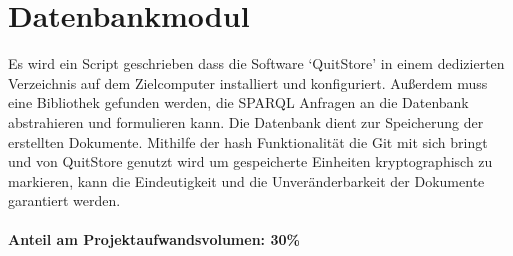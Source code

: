 \section{Datenbankmodul}
       
Es wird ein Script geschrieben dass die Software `QuitStore' in einem
dedizierten Verzeichnis auf dem Zielcomputer installiert und konfiguriert.
Außerdem muss eine Bibliothek gefunden werden, die SPARQL Anfragen an die
Datenbank abstrahieren und formulieren kann.
Die Datenbank dient zur Speicherung der erstellten Dokumente.
Mithilfe der hash Funktionalität die Git mit sich bringt und von QuitStore
genutzt wird um gespeicherte Einheiten kryptographisch zu markieren, kann die
Eindeutigkeit und die Unveränderbarkeit der Dokumente garantiert werden. 
\\
\\
\textbf{Anteil am Projektaufwandsvolumen: 30\%}